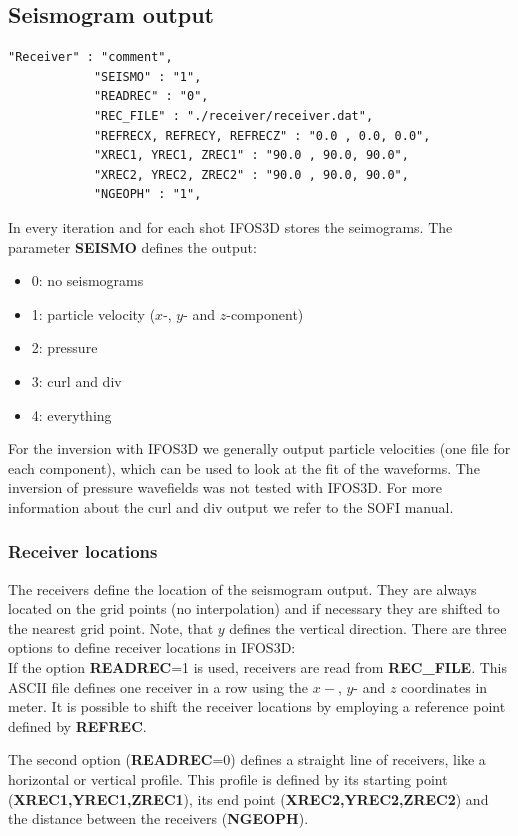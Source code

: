 \subsection{Seismogram output}
\begin{verbatim}
"Receiver" : "comment",
			"SEISMO" : "1",
			"READREC" : "0",
			"REC_FILE" : "./receiver/receiver.dat",
			"REFRECX, REFRECY, REFRECZ" : "0.0 , 0.0, 0.0",
			"XREC1, YREC1, ZREC1" : "90.0 , 90.0, 90.0",
			"XREC2, YREC2, ZREC2" : "90.0 , 90.0, 90.0",
			"NGEOPH" : "1",
\end{verbatim}
In every iteration and for each shot IFOS3D stores the seimograms. The parameter \textbf{SEISMO} defines the output:
\begin{itemize}
 \item 0: no seismograms
 \item 1: particle velocity ($x$-, $y$- and $z$-component)
 \item 2: pressure
 \item 3: curl and div 
 \item 4: everything
\end{itemize}
For the inversion with IFOS3D we generally output particle velocities (one file for each component), which can be used to look at the fit of the waveforms. The inversion of pressure wavefields was not tested with IFOS3D. 
For more information about the curl and div output we refer to the SOFI manual.

\subsubsection*{Receiver locations}
The receivers define the location of the seismogram output. They are always located on the grid points (no interpolation) and if necessary they are shifted to the nearest grid point. Note, that $y$ defines the vertical direction. 
There are three options to define receiver locations in IFOS3D:\vspace{0.3cm}\\

If the option \textbf{READREC}=1 is used, receivers are read from \textbf{REC\_FILE}. This ASCII file defines one receiver in a row using the $x-$, $y$- and $z$ coordinates in meter. 
It is possible to shift the receiver locations by employing a reference point defined by \textbf{REFREC}.




The second option (\textbf{READREC}=0) defines a straight line of receivers, like a horizontal or vertical profile. This profile is defined by its starting point (\textbf{XREC1,YREC1,ZREC1}), 
its end point (\textbf{XREC2,YREC2,ZREC2}) and the distance between the receivers (\textbf{NGEOPH}).

